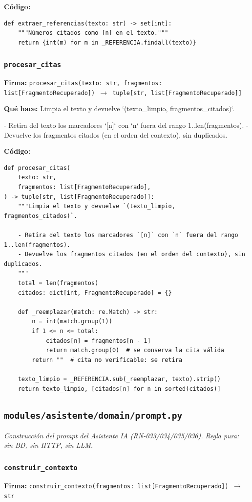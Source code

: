 \documentclass[11pt,a4paper]{article}
\begin{document}
\textbf{Código:}
\begin{lstlisting}
def extraer_referencias(texto: str) -> set[int]:
    """Números citados como [n] en el texto."""
    return {int(m) for m in _REFERENCIA.findall(texto)}
\end{lstlisting}

\subsubsection*{\texttt{procesar\_citas}}
\textbf{Firma:} \texttt{procesar\_citas(texto: str, fragmentos: list[FragmentoRecuperado]) $\rightarrow$ tuple[str, list[FragmentoRecuperado]]}

\textbf{Qué hace:} Limpia el texto y devuelve `(texto\_limpio, fragmentos\_citados)`.

- Retira del texto los marcadores `[n]` con `n` fuera del rango 1..len(fragmentos).
- Devuelve los fragmentos citados (en el orden del contexto), sin duplicados.

\textbf{Código:}
\begin{lstlisting}
def procesar_citas(
    texto: str,
    fragmentos: list[FragmentoRecuperado],
) -> tuple[str, list[FragmentoRecuperado]]:
    """Limpia el texto y devuelve `(texto_limpio, fragmentos_citados)`.

    - Retira del texto los marcadores `[n]` con `n` fuera del rango 1..len(fragmentos).
    - Devuelve los fragmentos citados (en el orden del contexto), sin duplicados.
    """
    total = len(fragmentos)
    citados: dict[int, FragmentoRecuperado] = {}

    def _reemplazar(match: re.Match) -> str:
        n = int(match.group(1))
        if 1 <= n <= total:
            citados[n] = fragmentos[n - 1]
            return match.group(0)  # se conserva la cita válida
        return ""  # cita no verificable: se retira

    texto_limpio = _REFERENCIA.sub(_reemplazar, texto).strip()
    return texto_limpio, [citados[n] for n in sorted(citados)]
\end{lstlisting}

\subsection{\texttt{modules/asistente/domain/prompt.py}}
\textit{Construcción del prompt del Asistente IA (RN-033/034/035/036). Regla pura: sin BD, sin HTTP, sin LLM.}

\subsubsection*{\texttt{construir\_contexto}}
\textbf{Firma:} \texttt{construir\_contexto(fragmentos: list[FragmentoRecuperado]) $\rightarrow$ str}
\end{document}
